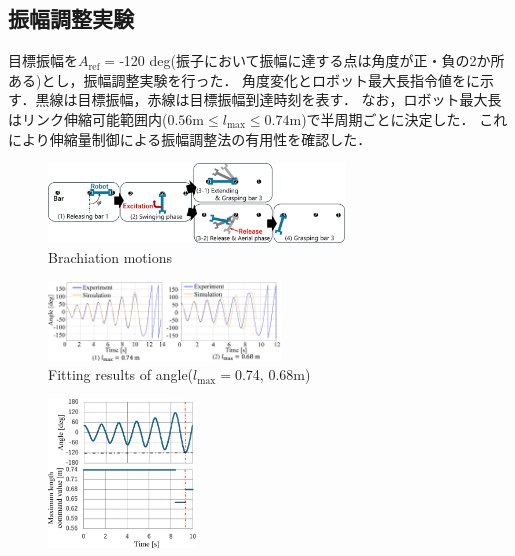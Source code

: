 \begin{small}
\subsection{振幅調整実験}
目標振幅を$A_{\mathrm{ref}}=$‐120 deg(振子において振幅に達する点は角度が正・負の2か所ある)とし，振幅調整実験を行った．
角度変化とロボット最大長指令値をに示す．黒線は目標振幅，赤線は目標振幅到達時刻を表す．
なお，ロボット最大長はリンク伸縮可能範囲内($0.56\mathrm{m}\le l_{\mathrm{max}} \le 0.74\mathrm{m}$)で半周期ごとに決定した．
これにより伸縮量制御による振幅調整法の有用性を確認した．
\begin{figure}[t]
  \centering
  \includegraphics[width=0.7\textwidth]{fig/brachiationFig-5.eps} %
  \vspace{-5mm}
  \caption{Brachiation motions}
\end{figure}
\begin{figure}[t]
  \centering
  \includegraphics[width=0.55\textwidth]{fig/FittingAngle3.eps} %
  \vspace{-10mm}
  \caption{Fitting results of angle($l_{\mathrm{max}}=$0.74, 0.68m)}
\end{figure}
\begin{figure}[h]
  \centering
  \includegraphics[width=0.35\textwidth]{fig/AdjustForMaezuri.eps} %
  \vspace{-7mm}

\end{figure}
\end{small}
